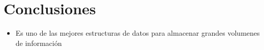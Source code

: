 \documentclass[9pt,a4paper,twoside]{rho-class/rho}
\begin{document}
    \section{Conclusiones}

        \begin{itemize}
        \item Es uno de las mejores estructuras de datos para almacenar grandes volumenes de información
        \end{itemize}
    
    \printbibliography
 
    \renewcommand{\contentsname}{Tabla de Contenidos}
    \tableofcontents
    \linenumbers


\end{document}
